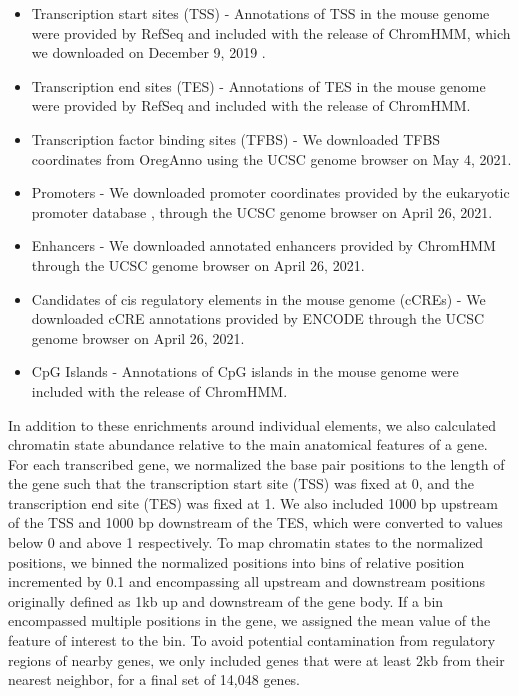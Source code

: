 \documentclass[
  11pt,
]{article}
\providecommand{\tightlist}{%
  \setlength{\itemsep}{0pt}\setlength{\parskip}{0pt}}
\begin{document}
\begin{itemize}
\tightlist
\item
  Transcription start sites (TSS) - Annotations of TSS in the mouse
  genome were provided by RefSeq \citep{pmid26553804} and included with
  the release of ChromHMM, which we downloaded on December 9, 2019
  \citep{pmid29120462}.
\item
  Transcription end sites (TES) - Annotations of TES in the mouse genome
  were provided by RefSeq and included with the release of ChromHMM.
\item
  Transcription factor binding sites (TFBS) - We downloaded TFBS
  coordinates from OregAnno \citep{pmid26578589} using the UCSC genome
  browser \citep{pmid12045153} on May 4, 2021.
\item
  Promoters - We downloaded promoter coordinates provided by the
  eukaryotic promoter database \citep{pmid27899657, pmid27899657},
  through the UCSC genome browser on April 26, 2021.
\item
  Enhancers - We downloaded annotated enhancers provided by ChromHMM
  through the UCSC genome browser on April 26, 2021.
\item
  Candidates of cis regulatory elements in the mouse genome (cCREs) - We
  downloaded cCRE annotations provided by ENCODE
  \citep{pmid22955616, pmid32728249} through the UCSC genome browser on
  April 26, 2021.
\item
  CpG Islands - Annotations of CpG islands in the mouse genome were
  included with the release of ChromHMM.
\end{itemize}

In addition to these enrichments around individual elements, we also
calculated chromatin state abundance relative to the main anatomical
features of a gene. For each transcribed gene, we normalized the base
pair positions to the length of the gene such that the transcription
start site (TSS) was fixed at 0, and the transcription end site (TES)
was fixed at 1. We also included 1000 bp upstream of the TSS and 1000 bp
downstream of the TES, which were converted to values below 0 and above
1 respectively. To map chromatin states to the normalized positions, we
binned the normalized positions into bins of relative position
incremented by 0.1 and encompassing all upstream and downstream
positions originally defined as 1kb up and downstream of the gene body.
If a bin encompassed multiple positions in the gene, we assigned the
mean value of the feature of interest to the bin. To avoid potential
contamination from regulatory regions of nearby genes, we only included
genes that were at least 2kb from their nearest neighbor, for a final
set of 14,048 genes.
\end{document}
